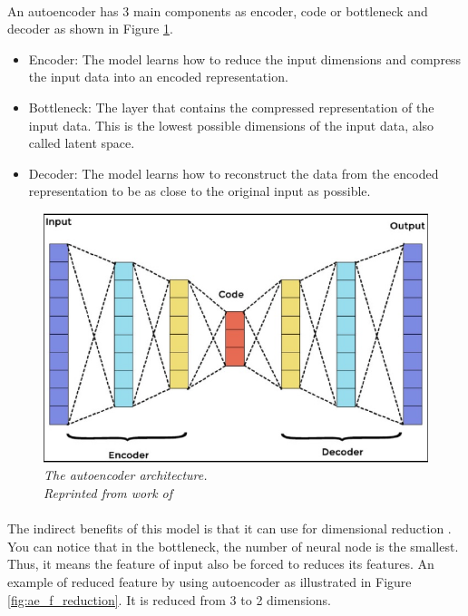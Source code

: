 \paragraph{}
An autoencoder has 3 main components \cite{badr_2019} as encoder, code or bottleneck and decoder as shown in Figure \ref{fig:ae_architecture}.
\begin{itemize}
\item Encoder: The model learns how to reduce the input dimensions and compress the input data into an encoded representation.
\item Bottleneck: The layer that contains the compressed representation of the input data. This is the lowest possible dimensions of the input data, also called latent space.
\item Decoder: The model learns how to reconstruct the data from the encoded representation to be as close to the original input as possible.
\end{itemize}

\begin{figure}[H]
  \centering
  \caption[The autoencoder architecture.]{\emph{The autoencoder architecture. \\
  Reprinted from work of \citeauthor{pedamkar_2019} \citeyear{pedamkar_2019}}}\label{fig:ae_architecture}
  \includegraphics[scale = 0.5]{figures/ae_architecture.jpg}  
\end{figure}

\paragraph{}
The indirect benefits of this model is that it can use for dimensional reduction \cite{rajan_2021}. You can notice that in the bottleneck, the number of neural node is the smallest. Thus, it means the feature of input also be forced to reduces its features. An example of reduced feature by using autoencoder as illustrated in Figure \ref{fig:ae_f_reduction}. It is reduced from 3 to 2 dimensions.


